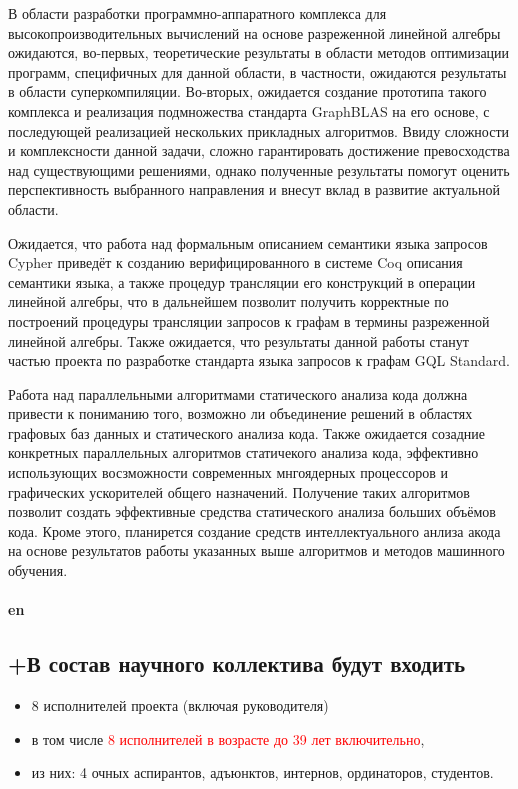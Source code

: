 \documentclass[12pt]{article}  %
\theoremstyle{remark}
\newcommand{\checkme}[1]{\textcolor{red}{#1}}
\begin{document}
В области разработки программно-аппаратного комплекса для высокопроизводительных вычислений на основе разреженной линейной алгебры ожидаются, во-первых, теоретические результаты в области методов оптимизации программ, специфичных для данной области, в частности, ожидаются результаты в области суперкомпиляции. Во-вторых, ожидается создание прототипа такого комплекса и реализация подмножества стандарта GraphBLAS на его основе, с последующей реализацией нескольких прикладных алгоритмов. Ввиду сложности и комплексности данной задачи, сложно гарантировать достижение превосходства над существующими решениями, однако полученные результаты помогут оценить перспективность выбранного направления и внесут вклад в развитие актуальной области. 

Ожидается, что работа над формальным описанием семантики языка запросов Cypher приведёт к созданию верифицированного в системе Coq описания семантики языка, а также процедур трансляции его конструкций в операции линейной алгебры, что в дальнейшем позволит получить корректные по построений процедуры трансляции запросов к графам в термины разреженной линейной алгебры. Также ожидается, что результаты данной работы станут частью проекта по разработке стандарта языка запросов к графам GQL Standard. 

Работа над параллельными алгоритмами статического анализа кода должна привести к пониманию того, возможно ли объединение решений в областях графовых баз данных и статического анализа кода. Также ожидается созадние конкретных параллельных алгоритмов статичекого анализа кода, эффективно использующих восзможности современных мнгоядерных процессоров и графических ускорителей общего назначений. Получение таких алгоритмов позволит создать эффективные средства статического анализа больших объёмов кода. Кроме этого, планирется создание средств интеллектуального анлиза акода на основе результатов работы указанных выше алгоритмов и методов машинного обучения.
\\
\\
\textbf{en}\\


\subsection{+В состав научного коллектива будут входить}
%
\begin{itemize}
\item 8 исполнителей проекта (включая руководителя)
\item в том числе \checkme{8  исполнителей в возрасте до 39 лет включительно},
\item из них: 4 очных аспирантов, адъюнктов, интернов, ординаторов, студентов.
\end{itemize}
\end{document}
